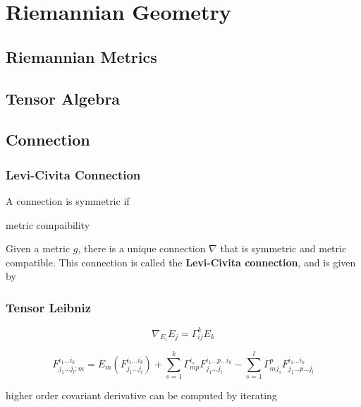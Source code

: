 \chapter{Riemannian Geometry}


\section{Riemannian Metrics}

\section{Tensor Algebra}

\section{Connection}

\subsection{Levi-Civita Connection}

A connection is symmetric if 


metric compaibility

\begin{theorem}
    Given a metric $g$, there is a unique connection $\nabla$ that is symmetric and metric compatible.
    This connection is called the \textbf{Levi-Civita connection}, and is given by
\end{theorem}

\subsection{Tensor Leibniz}


\begin{equation*}
    \nabla_{E_i}E_j=\Gamma^k_{ij}E_k
\end{equation*}


\begin{proposition}
    \begin{equation*}
        F^{i_1\dots i_k}_{j_1\dots j_l;m}=E_m(F^{i_1\dots i_k}_{j_1\dots j_l})+\sum_{s=1}^{k}\Gamma^{i_s}_{mp} F^{i_1 \dots p \dots i_k}_{j_1\dots j_l}-\sum_{s=1}^{l}\Gamma^{p}_{mj_s} F^{i_1 \dots i_k}_{j_1\dots p \dots j_l}
    \end{equation*}
\end{proposition}

higher order covariant derivative can be computed by iterating


